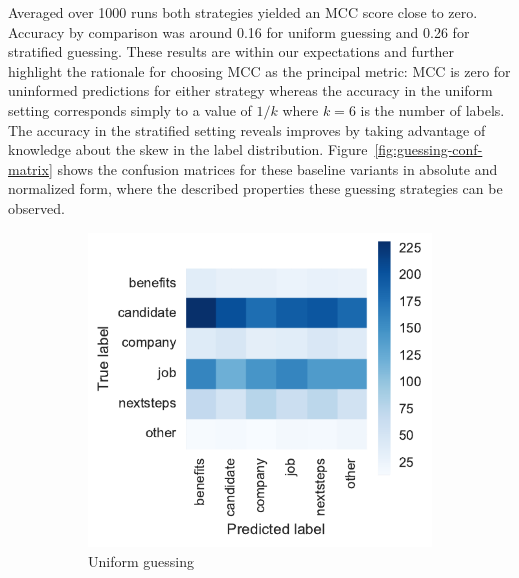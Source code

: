 Averaged over 1000 runs both strategies yielded an \gls{MCC} score close to zero. Accuracy by comparison was around 0.16 for uniform guessing and 0.26 for stratified guessing. These results are within our expectations and further highlight the rationale for choosing \gls{MCC} as the principal metric: \gls{MCC} is zero for uninformed predictions for either strategy whereas the accuracy in the uniform setting corresponds simply to a value of $1/k$ where $k = 6$ is the number of labels. The accuracy in the stratified setting reveals improves by taking advantage of knowledge about the skew in the label distribution. Figure~\ref{fig:guessing-conf-matrix} shows the confusion matrices for these baseline variants in absolute and normalized form, where the described properties these guessing strategies can be observed.

\begin{figure}
    \centering
    \begin{subfigure}[b]{0.47\textwidth}
        \includegraphics[width=\textwidth]{img/exp-vector-space/guessing-conf-matrix-uniform.pdf}
        \caption{Uniform guessing}
\label{fig:guessing-conf-matrix-uniform}
    \end{subfigure}
~\begin{subfigure}[b]{0.48\textwidth}

\end{subfigure}
\end{figure}
